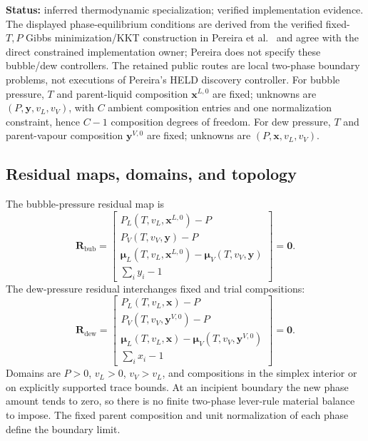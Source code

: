 \documentclass[11pt]{article}
\newcommand{\Evidence}[1]{\textsf{#1}}
\newcommand{\Status}[1]{\textbf{Status:} \Evidence{#1}.}
\begin{document}
\Status{inferred thermodynamic specialization; verified implementation evidence}
The displayed phase-equilibrium conditions are derived from the verified
fixed-\(T,P\) Gibbs minimization/KKT construction in Pereira
et al.~\cite{Pereira2012} and agree with the direct constrained implementation
owner; Pereira does not specify these bubble/dew controllers. The retained
public routes are local
two-phase boundary problems, not executions of Pereira's HELD discovery
controller. For bubble pressure, \(T\) and parent-liquid composition
\(\boldsymbol x^{L,0}\) are fixed; unknowns are
\((P,\boldsymbol y,v_L,v_V)\), with \(C\) ambient composition entries and one
normalization constraint, hence \(C-1\) composition degrees of freedom. For
dew pressure, \(T\) and parent-vapour composition
\(\boldsymbol y^{V,0}\) are fixed; unknowns are
\((P,\boldsymbol x,v_L,v_V)\).

\subsection{Residual maps, domains, and topology}

The bubble-pressure residual map is
\begin{equation}
 \boldsymbol R_{\mathrm{bub}}=
 \begin{bmatrix}
 P_L(T,v_L,\boldsymbol x^{L,0})-P\\
 P_V(T,v_V,\boldsymbol y)-P\\
 \boldsymbol\mu_L(T,v_L,\boldsymbol x^{L,0})
 -\boldsymbol\mu_V(T,v_V,\boldsymbol y)\\
 \sum_i y_i-1
 \end{bmatrix}
 =\boldsymbol0.
\label{eq:eqform:bubble-residual}
\end{equation}
The dew-pressure residual interchanges fixed and trial compositions:
\begin{equation}
 \boldsymbol R_{\mathrm{dew}}=
 \begin{bmatrix}
 P_L(T,v_L,\boldsymbol x)-P\\
 P_V(T,v_V,\boldsymbol y^{V,0})-P\\
 \boldsymbol\mu_L(T,v_L,\boldsymbol x)
 -\boldsymbol\mu_V(T,v_V,\boldsymbol y^{V,0})\\
 \sum_i x_i-1
 \end{bmatrix}
 =\boldsymbol0.
\label{eq:eqform:dew-residual}
\end{equation}
Domains are \(P>0\), \(v_L>0\), \(v_V>v_L\), and compositions in the
simplex interior or on explicitly supported trace bounds. At an incipient
boundary the new phase amount tends to zero, so there is no finite two-phase
lever-rule material balance to impose. The fixed parent composition and unit
normalization of each phase define the boundary limit.
\end{document}
